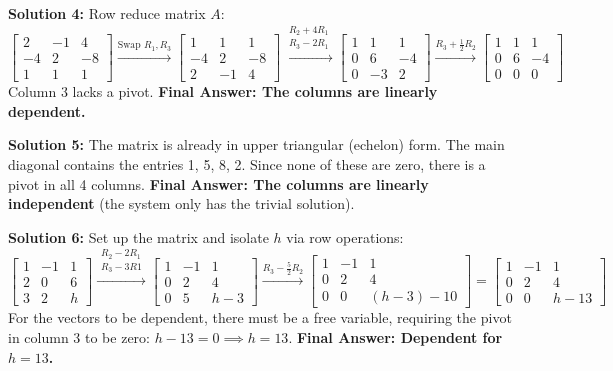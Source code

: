 \documentclass[12pt]{article}
\begin{document}
\textbf{Solution 4:} Row reduce matrix $A$:
$$ \begin{bmatrix} 2 & -1 & 4 \\ -4 & 2 & -8 \\ 1 & 1 & 1 \end{bmatrix} \xrightarrow{\text{Swap } R_1, R_3} \begin{bmatrix} 1 & 1 & 1 \\ -4 & 2 & -8 \\ 2 & -1 & 4 \end{bmatrix} \xrightarrow{\substack{R_2 + 4R_1 \\ R_3 - 2R_1}} \begin{bmatrix} 1 & 1 & 1 \\ 0 & 6 & -4 \\ 0 & -3 & 2 \end{bmatrix} \xrightarrow{R_3 + \frac{1}{2}R_2} \begin{bmatrix} 1 & 1 & 1 \\ 0 & 6 & -4 \\ 0 & 0 & 0 \end{bmatrix} $$
Column 3 lacks a pivot. \textbf{Final Answer: The columns are linearly dependent.}

\textbf{Solution 5:} The matrix is already in upper triangular (echelon) form. The main diagonal contains the entries 1, 5, 8, 2. Since none of these are zero, there is a pivot in all 4 columns. \textbf{Final Answer: The columns are linearly independent} (the system only has the trivial solution).

\textbf{Solution 6:} Set up the matrix and isolate $h$ via row operations:
$$ \begin{bmatrix} 1 & -1 & 1 \\ 2 & 0 & 6 \\ 3 & 2 & h \end{bmatrix} \xrightarrow{\substack{R_2 - 2R_1 \\ R_3 - 3R1}} \begin{bmatrix} 1 & -1 & 1 \\ 0 & 2 & 4 \\ 0 & 5 & h-3 \end{bmatrix} \xrightarrow{R_3 - \frac{5}{2}R_2} \begin{bmatrix} 1 & -1 & 1 \\ 0 & 2 & 4 \\ 0 & 0 & (h-3) - 10 \end{bmatrix} = \begin{bmatrix} 1 & -1 & 1 \\ 0 & 2 & 4 \\ 0 & 0 & h-13 \end{bmatrix} $$
For the vectors to be dependent, there must be a free variable, requiring the pivot in column 3 to be zero: $h - 13 = 0 \implies h = 13$. \textbf{Final Answer: Dependent for $h = 13$.}
\end{document}
